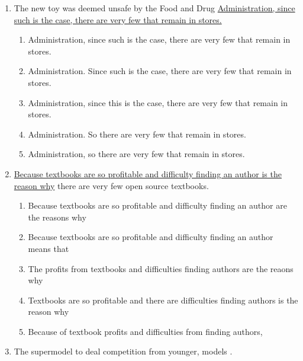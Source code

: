 \begin{enumerate}
\item The new toy was deemed unsafe by the Food and Drug \ul{Administration, since such is the case, there are very few that remain in stores.}

\bigskip
\begin{enumerate}[label=(\Alph*)]
\item Administration, since such is the case, there are very few that remain in stores.
\item Administration. Since such is the case, there are very few that remain in stores. 
\item Administration, since this is the case, there are very few that remain in stores.
\item Administration. So there are very few that remain in stores. 
\item Administration, so there are very few that remain in stores.
\end{enumerate}


\item \ul{Because textbooks are so profitable and difficulty finding an author is the reason why} there are very few open source textbooks. 

\bigskip
\begin{enumerate}[label=(\Alph*)]
\item Because textbooks are so profitable and difficulty finding an author are the reasons why
\item Because textbooks are so profitable and difficulty finding an author means that
\item The profits from textbooks and difficulties finding authors are the reaons why
\item Textbooks are so profitable and there are difficulties finding authors is the reason why
\item Because of textbook profits and difficulties from finding authors,
\end{enumerate}


\item \begin{inparaenum}[A]
The supermodel  to deal  competition from younger,  models . 
\end{inparaenum}


\end{enumerate}
